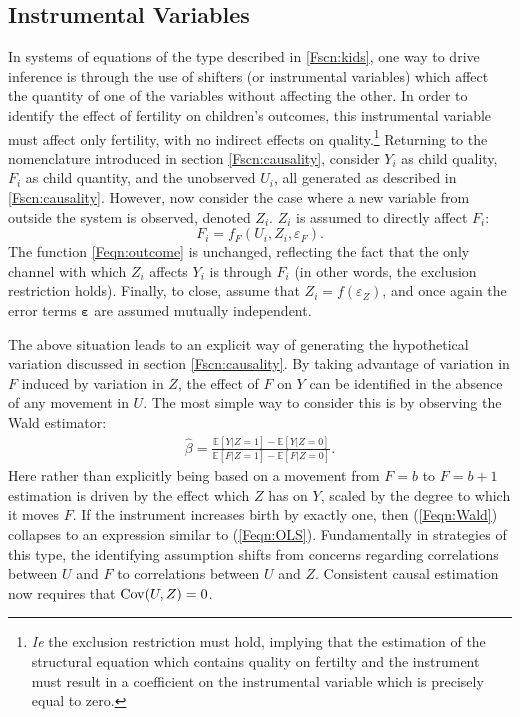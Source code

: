 \subsection{Instrumental Variables}
\label{Fsscn:kidIV}
In systems of equations of the type described in \ref{Fscn:kids}, one way to 
drive inference is through the
use of shifters (or instrumental variables) which affect the quantity of one of
the variables without affecting the other.  In order to identify the effect of 
fertility on children's outcomes, this instrumental variable must affect only 
fertility, with no indirect effects on quality.\footnote{\emph{Ie} the exclusion 
restriction must hold, implying that the estimation of the structural equation 
which contains quality on fertilty and the instrument must result in a 
coefficient on the instrumental variable which is precisely equal to zero.}
Returning to the nomenclature introduced in section \ref{Fscn:causality},
consider $Y_i$ as child quality, $F_i$ as child quantity, and the unobserved
$U_i$, all generated as described in \ref{Fscn:causality}.  However, now consider 
the case where a new variable from outside the system is observed, denoted 
$Z_i$.  $Z_i$ is assumed to directly affect $F_i$:
\[
F_i = f_F(U_i,Z_i,\varepsilon_F).
\]
The function \ref{Feqn:outcome} is unchanged, reflecting the fact that the only
channel with which $Z_i$ affects $Y_i$ is through $F_i$ (in other words, the 
exclusion restriction holds). Finally, to close, assume that 
$Z_i=f(\varepsilon_Z)$, and once again the error terms $\bm{\varepsilon}$ are 
assumed mutually independent.

The above situation leads to an explicit way of generating the hypothetical 
variation discussed in section \ref{Fscn:causality}.  By taking advantage of 
variation in $F$ induced by variation in $Z$, the effect of $F$ on $Y$ can
be identified in the absence of any movement in $U$.  The most simple way to
consider this is by observing the Wald estimator:
\begin{eqnarray}
\label{Feqn:Wald}
\hat\beta = \frac{\mathbb{E}[Y|Z=1]-\mathbb{E}[Y|Z=0]}{\mathbb{E}[F|Z=1]-\mathbb{E}[F|Z=0]}.
\end{eqnarray}
Here rather than explicitly being based on a movement from $F=b$ to $F=b+1$
estimation is driven by the effect which $Z$ has on $Y$, scaled by the
degree to which it moves $F$.  If the instrument increases birth by exactly
one, then (\ref{Feqn:Wald}) collapses to an expression similar to 
(\ref{Feqn:OLS}).  Fundamentally in strategies of this type, the identifying
assumption shifts from concerns regarding correlations between $U$ and $F$
to correlations between $U$ and $Z$.  Consistent causal estimation now 
requires that $\mathrm{Cov}(U,Z)=0$.

